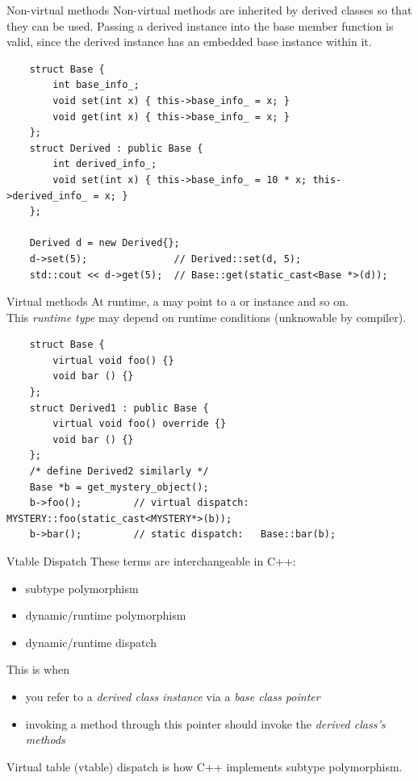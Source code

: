 \begin{frame}[fragile]{Non-virtual methods}
  Non-virtual methods are inherited by derived classes so that they can be used. 
  Passing a derived instance into the base member function is valid, since the derived
  instance has an embedded base instance within it.
  \begin{verbatim}
    struct Base {
        int base_info_;
        void set(int x) { this->base_info_ = x; }
        void get(int x) { this->base_info_ = x; }
    };
    struct Derived : public Base { 
        int derived_info_; 
        void set(int x) { this->base_info_ = 10 * x; this->derived_info_ = x; }
    };

    Derived d = new Derived{};
    d->set(5);               // Derived::set(d, 5);
    std::cout << d->get(5);  // Base::get(static_cast<Base *>(d));
  \end{verbatim}
\end{frame}

\begin{frame}[fragile]{Virtual methods}
  At runtime, a  may point to a  or  
  instance and so on. \\
  This \emph{runtime type} may depend on runtime conditions (unknowable by compiler).\\
  \begin{verbatim}
    struct Base {
        virtual void foo() {}
        void bar () {}
    };
    struct Derived1 : public Base {
        virtual void foo() override {}
        void bar () {}
    };
    /* define Derived2 similarly */
    Base *b = get_mystery_object();
    b->foo();         // virtual dispatch:  MYSTERY::foo(static_cast<MYSTERY*>(b));
    b->bar();         // static dispatch:   Base::bar(b);
  \end{verbatim}
\end{frame}

\begin{frame}[fragile]{Vtable Dispatch}
  These terms are interchangeable in C++:
  \begin{itemize}
    \item subtype polymorphism
    \item dynamic/runtime polymorphism
    \item dynamic/runtime dispatch
  \end{itemize}

  This is when 
  \begin{itemize}
    \item you refer to a \emph{derived class instance} via a \emph{base class pointer}
    \item invoking a method through this pointer should invoke the \emph{derived class's methods}
  \end{itemize}

  \begin{sqt:result}
    Virtual table (vtable) dispatch is how C++ implements subtype polymorphism.
  \end{sqt:result}
\end{frame}

